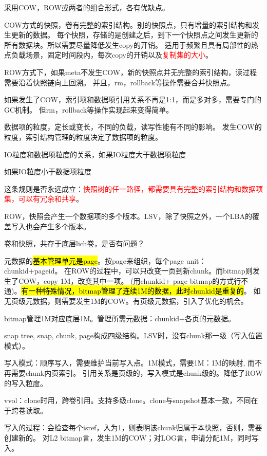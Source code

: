 采用COW，ROW或两者的组合形式，各有优缺点。

COW方式的快照，卷有完整的索引结构。别的快照点，只有增量的索引结构和发生更新的数据。
每个快照，存储的是创建之后，到下一个快照点之间发生更新的所有数据块。所以需要尽量降低发生copy的开销。
适用于频繁且具有局部性的热点负载场景，固定时间段内，每次copy的开销以及\textcolor{red}{复制集的大小}。

ROW方式下，如果meta不发生COW，新的快照点并无完整的索引结构，读过程需要沿着快照链向上回溯。
并且，rm，rollback等操作需要合并快照点。

如果发生了COW，索引项和数据项引用关系不再是1:1，而是多对多，需要专门的GC机制。
但rm，rollback等操作实现起来变得简单。

数据项的粒度，定长或变长，不同的负载，读写性能有不同的影响。
发生COW的粒度，索引结构管理的粒度决定了数据项的粒度。

IO粒度和数据项粒度的关系，如果IO粒度大于数据项粒度

如果IO粒度小于数据项粒度

这条规则是否永远成立：\textcolor{red}{快照树的任一路径，都需要具有完整的索引结构和数据项集，可以有冗余和共享}。


ROW，快照会产生一个数据项的多个版本。LSV，除了快照之外，一个LBA的覆盖写入也会产生多个版本。

卷和快照，共存于底层lich卷，是否有问题？

元数据的\hl{基本管理单元是page}。按page来组织，每个page unit：chunkid+pageid。
在ROW的过程中，可以只改变一页到新chunk。而bitmap则发生了COW，copy 1M，改变其中一项。
(用chunkid+ page bitmap的方式行不通)。\hl{有一种特殊情况，bitmap管理了连续1M的数据，此时chunkid是重复的}。
如无页级元数据，则需要发生1M的COW。有页级元数据，引入了优化的机会。

bitmap管理1M对应底层1M。管理所需元数据：chunkid+各页的元数据。

snap tree, snap, chunk, page构成四级结构。LSV时，没有chunk那一级（写入位置模式）。

写入模式：顺序写入，需要维护当前写入点。1M模式，需要1M：1M的映射, 而不再需要chunk内页索引。
引用关系是页级的，写入模式是chunk级的。降低了ROW的写入粒度。

vvol：clone时用，跨卷引用。支持多级clone。clone与snapshot基本一致，不同在于跨卷读取。

写入的过程：会检查每个isref，入为1，则表明该chunk归属于本快照，否则，需要创建新的。
对L2 bitmap言，发生1M的COW；对LOG言，申请分配1M，同时写入。

